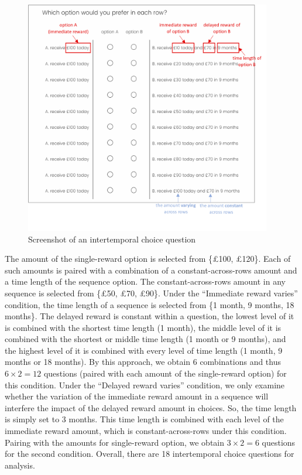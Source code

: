 \documentclass[
  12pt,
]{article}
\begin{document}
\begin{figure}
  \vspace{16pt}
  \centering
  \includegraphics[width=0.96\textwidth]{figures/screenshot.png}
  \caption{Screenshot of an intertemporal choice question}
  \label{fig:question}
\end{figure}

The amount of the single-reward option is selected from \{£100, £120\}.
Each of such amounts is paired with a combination of a
constant-across-rows amount and a time length of the sequence option.
The constant-across-rows amount in any sequence is selected from \{£50,
£70, £90\}. Under the ``Immediate reward varies'' condition, the time
length of a sequence is selected from \{1 month, 9 months, 18 months\}.
The delayed reward is constant within a question, the lowest level of it
is combined with the shortest time length (1 month), the middle level of
it is combined with the shortest or middle time length (1 month or 9
months), and the highest level of it is combined with every level of
time length (1 month, 9 months or 18 months). By this approach, we
obtain 6 combinations and thus \(6\times2=12\) questions (paired with
each amount of the single-reward option) for this condition. Under the
``Delayed reward varies'' condition, we only examine whether the
variation of the immediate reward amount in a sequence will interfere
the impact of the delayed reward amount in choices. So, the time length
is simply set to 3 months. This time length is combined with each level
of the immediate reward amount, which is constant-across-rows under this
condition. Pairing with the amounts for single-reward option, we obtain
\(3\times2=6\) questions for the second condition. Overall, there are 18
intertemporal choice questions for analysis.
\end{document}
